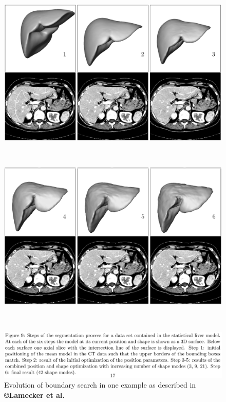 \documentclass[]{article}
\begin{document}
	\begin{figure}[ht!]
		\centering
		\begin{minipage}{0.7\linewidth}
			\includegraphics[width=\linewidth]{images/image5}
		\end{minipage}\\
		\begin{minipage}{0.7\linewidth}
			\includegraphics[width=\linewidth]{images/image13}
		\end{minipage}\\
		\begin{minipage}{0.7\linewidth}
			\includegraphics[width=\linewidth]{images/image18}
		\end{minipage}
		\caption{Evolution of boundary search in one example as described in \textbf{©Lamecker et al.} \cite{Lamecker2004}}
		\label{Lamecker2004_Fig9}
	\end{figure}
	
\end{document}
